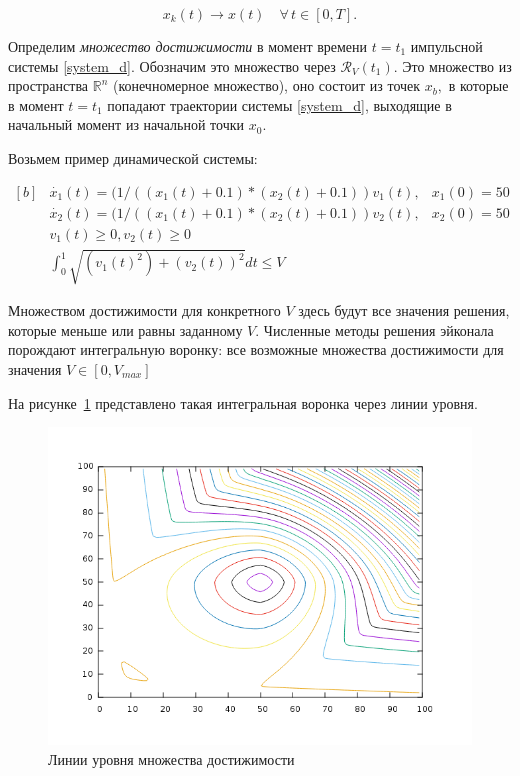 \documentclass[a4paper,12pt]{article}
\begin{document}
\begin{equation*}
  x_k(t)\to x(t) \quad  \forall \, t\in [0,T].
\end{equation*}

Определим \emph{множество достижимости} в момент  времени $t=t_1$
импульсной системы \eqref{system_d}. Обозначим это множество через 
$ {\mathcal R}_V(t_1)$. Это множество из  пространства ${\mathbb R}^n$
(конечномерное  множество), оно состоит из точек $x_b,$ в  которые в
момент $t=t_1$ попадают траектории  системы \eqref{system_d}, выходящие
в начальный  момент из начальной точки $x_0$.

Возьмем пример динамической системы:

\begin{equation*}
  \begin{aligned}[b]
    &\dot{x_1}(t) = (1/((x_1(t)+0.1) * (x_2(t)+0.1))v_1(t), & x_1(0)=50\\
    &\dot{x_2}(t) = (1/((x_1(t)+0.1) * (x_2(t)+0.1))v_2(t), & x_2(0) = 50\\[8pt]
    &v_1(t) \ge 0, v_2(t) \ge 0 \\
    &\int_{0}^{1} \sqrt{(v_1(t)^2) + (v_2(t))^2} dt \le V
  \end{aligned}
\end{equation*}

Множеством достижимости для конкретного $V$ здесь будут все значения
решения, которые меньше или равны заданному $V$. Численные методы
решения эйконала порождают интегральную воронку: все возможные
множества достижимости для значения $V \in [0,V_{max}]$

На рисунке~\ref{fig:impulse-example-levels} представлено такая
интегральная воронка через линии уровня.

\begin{figure}[H]
  \centering
  \includegraphics[width=0.5\linewidth]{impulse-example-levels.png}
  \hfil \caption{Линии уровня множества достижимости}
  \label{fig:impulse-example-levels}
\end{figure}
\end{document}
